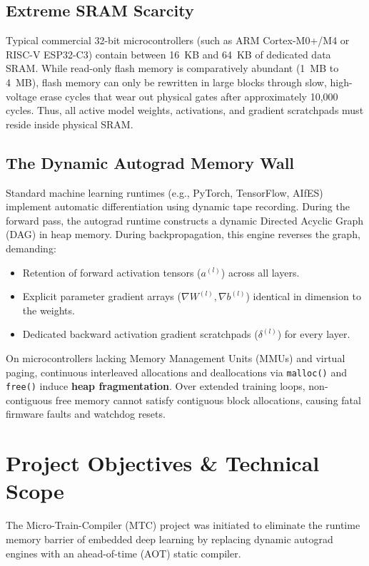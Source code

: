 \documentclass[12pt,a4paper]{report}
\begin{document}
\subsection{Extreme SRAM Scarcity}
Typical commercial 32-bit microcontrollers (such as ARM Cortex-M0+/M4 or RISC-V ESP32-C3) contain between 16~KB and 64~KB of dedicated data SRAM. While read-only flash memory is comparatively abundant (1~MB to 4~MB), flash memory can only be rewritten in large blocks through slow, high-voltage erase cycles that wear out physical gates after approximately 10,000 cycles. Thus, all active model weights, activations, and gradient scratchpads must reside inside physical SRAM.

\subsection{The Dynamic Autograd Memory Wall}
Standard machine learning runtimes (e.g., PyTorch, TensorFlow, AIfES) implement automatic differentiation using dynamic tape recording. During the forward pass, the autograd runtime constructs a dynamic Directed Acyclic Graph (DAG) in heap memory. During backpropagation, this engine reverses the graph, demanding:
\begin{itemize}
    \item Retention of forward activation tensors ($a^{(l)}$) across all layers.
    \item Explicit parameter gradient arrays ($\nabla W^{(l)}, \nabla b^{(l)}$) identical in dimension to the weights.
    \item Dedicated backward activation gradient scratchpads ($\delta^{(l)}$) for every layer.
\end{itemize}

On microcontrollers lacking Memory Management Units (MMUs) and virtual paging, continuous interleaved allocations and deallocations via \texttt{malloc()} and \texttt{free()} induce \textbf{heap fragmentation}. Over extended training loops, non-contiguous free memory cannot satisfy contiguous block allocations, causing fatal firmware faults and watchdog resets.

\section{Project Objectives \& Technical Scope}
The Micro-Train-Compiler (MTC) project was initiated to eliminate the runtime memory barrier of embedded deep learning by replacing dynamic autograd engines with an ahead-of-time (AOT) static compiler.
\end{document}
